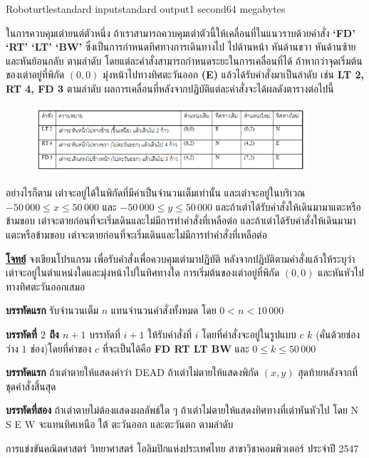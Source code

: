 \documentclass[11pt,a4paper]{article}
\begin{document}
\begin{problem}{Roboturtle}{standard input}{standard output}{1 second}{64 megabytes}


ในการควบคุมเต่ายนต์ตัวหนึ่ง ถ้าเราสามารถควบคุมเต่าตัวนี้ให้เคลื่อนที่ในแนวราบด้วยคำสั่ง \textbf{‘FD’ ‘RT’ ‘LT’ ‘BW’ }ซึ่งเป็นการกำหนดทิศทางการเดินทางไป ไปด้านหน้า หันด้านขวา หันด้านซ้าย และหันย้อนกลับ ตามลำดับ โดยแต่ละคำสั่งสามารถกำหนดระยะในการเคลื่อนที่ได้ ถ้าหากว่าจุดเริ่มต้นของเต่าอยู่ที่พิกัด $(0,0)$ มุ่งหน้าไปทางทิศตะวันออก \textbf{(E)} แล้วได้รับคำสั่งมาเป็นลำดับ เช่น \textbf{LT 2, RT 4, FD 3} ตามลำดับ ผลการเคลื่อนที่หลังจากปฏิบัติแต่ละคำสั่งจะได้ผลดังตารางต่อไปนี้

\begin{figure}[h]
\centering
\includegraphics[width=0.9\textwidth]{../latex/img/1018/1018-1.png}
\end{figure}

อย่างไรก็ตาม เต่าจะอยู่ได้ในพิกัดที่มีค่าเป็นจำนวนเต็มเท่านั้น และเต่าจะอยู่ในบริเวณ $-50\,000 \leq x \leq 50\,000$ และ $-50\,000 \leq y \leq 50\,000$ และถ้าเต่าได้รับคำสั่งให้เดินมามาแตะหรือข้ามขอบ เต่าจะตายก่อนที่จะเริ่มเดินและไม่มีการทำคำสั่งที่เหลือต่อ และถ้าเต่าได้รับคำสั่งให้เดินมามาแตะหรือข้ามขอบ เต่าจะตายก่อนที่จะเริ่มเดินและไม่มีการทำคำสั่งที่เหลือต่อ

\bigskip
\underline{\textbf{โจทย์}} จงเขียนโปรแกรม เพื่อรับคำสั่งเพื่อควบคุมเต่ามาปฏิบัติ หลังจากปฏิบัติตามคำสั่งแล้วให้ระบุว่า เต่าจะอยู่ในตำแหน่งใดและมุ่งหน้าไปในทิศทางใด การเริ่มต้นของเต่าอยู่ที่พิกัด $(0,0)$ และหันหัวไปทางทิศตะวันออกเสมอ

\InputFile

\textbf{บรรทัดแรก} รับจำนวนเต็ม $n$ แทนจำนวนคำสั่งทั้งหมด โดย $0 < n < 10\,000$

\textbf{บรรทัดที่ $2$ ถึง $n+1$} บรรทัดที่ $i+1$ ให้รับคำสั่งที่ $i$ โดยที่คำสั่งจะอยู่ในรูปแบบ $c$ $k$ (คั่นด้วยช่องว่าง $1$ ช่อง)โดยที่ค่าของ $c$ ที่จะเป็นได้คือ \textbf{FD RT LT BW} และ $0 \leq k \leq 50\,000$

\OutputFile

\textbf{บรรทัดแรก }ถ้าเต่าตายให้แสดงคำว่า DEAD ถ้าเต่าไม่ตายให้แสดงพิกัด $(x,y)$ สุดท้ายหลังจากที่ชุดคำสั่งสิ้นสุด

\textbf{บรรทัดที่สอง} ถ้าเต่าตายไม่ต้องแสดงผลลัพธ์ใด ๆ ถ้าเต่าไม่ตายให้แสดงทิศทางที่เต่าหันหัวไป โดย N S E W จะแทนทิศเหนือ ใต้ ตะวันออก และตะวันตก ตามลำดับ

\Examples

\begin{example}
%
%
\end{example}


\Source

การแข่งขันคณิตศาสตร์ วิทยาศาสตร์ โอลิมปิกแห่งประเทศไทย สาขาวิชาคอมพิวเตอร์ ประจำปี 2547

\end{problem}
\end{document}
